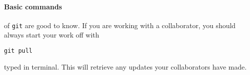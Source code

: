\documentclass{ximera}
\begin{document}



\paragraph{Basic commands} of \verb!git! are good to know.
If you are working with a collaborator, you should always start your work off with
\begin{verbatim}
git pull
\end{verbatim}
typed in terminal. This will retrieve any updates your collaborators have made. 
\end{document}
